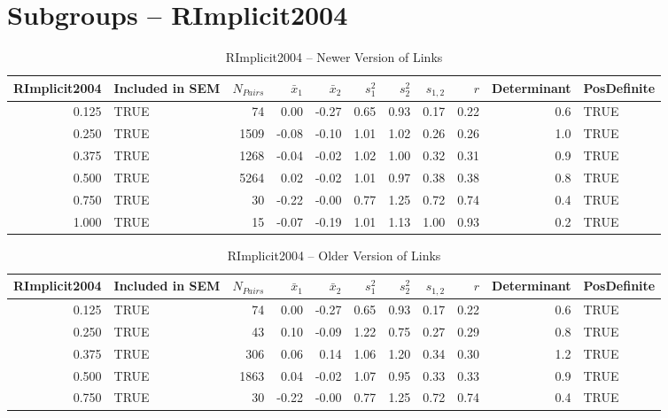 \documentclass{article}\usepackage[]{graphicx}\usepackage[]{color}
\begin{document}
\section{Subgroups --  RImplicit2004 }%
\begin{table}[ht]
\centering
\begin{tabular}{rlrrrrrrrrl}
  \hline
RImplicit2004 & Included in SEM & $N_{Pairs}$ & $\bar{x}_1$ & $\bar{x}_2$ & $s_1^2$ & $s_2^2$ & $s_{1,2}$ & $r$ & Determinant & PosDefinite \\ 
  \hline
0.125 & TRUE & 74 & 0.00 & -0.27 & 0.65 & 0.93 & 0.17 & 0.22 & 0.6 & TRUE \\ 
  0.250 & TRUE & 1509 & -0.08 & -0.10 & 1.01 & 1.02 & 0.26 & 0.26 & 1.0 & TRUE \\ 
  0.375 & TRUE & 1268 & -0.04 & -0.02 & 1.02 & 1.00 & 0.32 & 0.31 & 0.9 & TRUE \\ 
  0.500 & TRUE & 5264 & 0.02 & -0.02 & 1.01 & 0.97 & 0.38 & 0.38 & 0.8 & TRUE \\ 
  0.750 & TRUE & 30 & -0.22 & -0.00 & 0.77 & 1.25 & 0.72 & 0.74 & 0.4 & TRUE \\ 
  1.000 & TRUE & 15 & -0.07 & -0.19 & 1.01 & 1.13 & 1.00 & 0.93 & 0.2 & TRUE \\ 
   \hline
\end{tabular}
\caption{RImplicit2004 -- Newer Version of Links} 
\end{table}
\begin{table}[ht]
\centering
\begin{tabular}{rlrrrrrrrrl}
  \hline
RImplicit2004 & Included in SEM & $N_{Pairs}$ & $\bar{x}_1$ & $\bar{x}_2$ & $s_1^2$ & $s_2^2$ & $s_{1,2}$ & $r$ & Determinant & PosDefinite \\ 
  \hline
0.125 & TRUE & 74 & 0.00 & -0.27 & 0.65 & 0.93 & 0.17 & 0.22 & 0.6 & TRUE \\ 
  0.250 & TRUE & 43 & 0.10 & -0.09 & 1.22 & 0.75 & 0.27 & 0.29 & 0.8 & TRUE \\ 
  0.375 & TRUE & 306 & 0.06 & 0.14 & 1.06 & 1.20 & 0.34 & 0.30 & 1.2 & TRUE \\ 
  0.500 & TRUE & 1863 & 0.04 & -0.02 & 1.07 & 0.95 & 0.33 & 0.33 & 0.9 & TRUE \\ 
  0.750 & TRUE & 30 & -0.22 & -0.00 & 0.77 & 1.25 & 0.72 & 0.74 & 0.4 & TRUE \\ 
   \hline
\end{tabular}
\caption{RImplicit2004 -- Older Version of Links} 
\end{table}
\end{document}
